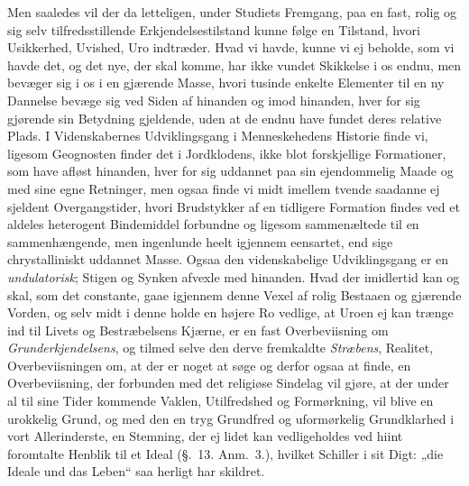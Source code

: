 \documentclass[12pt,a4paper]{book}
\newcommand{\apage}[1]{\marginnote{\footnotesize\textit{[#1]}}}
\begin{document}
Men saaledes vil der da letteligen, under Studiets Fremgang, paa en fast, rolig og
sig selv tilfredsstillende Erkjendelsestilstand kunne følge en Tilstand, hvori
Usikkerhed, Uvished, Uro indtræder. Hvad vi havde, kunne vi ej beholde, som vi
havde det, og det nye, der skal komme, har ikke vundet Skikkelse i os endnu, men
bevæger sig i os i en gjærende Masse, hvori tusinde enkelte Elementer til en ny
Dannelse bevæge sig ved Siden af hinanden og imod hinanden, hver for sig gjørende
sin Betydning gjeldende, uden at de endnu have fundet deres relative Plads. I
Videnskabernes Udviklingsgang i Menneskehedens Historie finde vi, ligesom
Geognosten finder det i Jordklodens, ikke blot forskjellige Formationer, som have
afløst hinanden, hver for sig uddannet paa sin ejendommelig Maade og med sine egne
Retninger, men ogsaa finde vi midt imellem tvende saadanne ej sjeldent
Overgangstider, hvori \apage{184}  Brudstykker af en tidligere Formation findes ved et aldeles
heterogent Bindemiddel forbundne og ligesom sammenæltede til en sammenhængende, men
ingenlunde heelt igjennem eensartet, end sige chrystalliniskt uddannet Masse.
Ogsaa den videnskabelige Udviklingsgang er en \emph{undulatorisk}; Stigen og Synken
afvexle med hinanden. Hvad der imidlertid kan og skal, som det constante, gaae
igjennem denne Vexel af rolig Bestaaen og gjærende Vorden, og selv midt i denne
holde en højere Ro vedlige, at Uroen ej kan trænge ind til Livets og
Bestræbelsens Kjærne, er en fast Overbeviisning om \emph{Grunderkjendelsens}, og tilmed
selve den derve fremkaldte \emph{Stræbens}, Realitet, Overbeviisningen om, at der er
noget at søge og derfor ogsaa at finde, en Overbeviisning, der forbunden med det
religiøse Sindelag vil gjøre, at der under al til sine Tider kommende Vaklen,
Utilfredshed og Formørkning, vil blive en urokkelig Grund, og med den en tryg
Grundfred og uformørkelig Grundklarhed i vort Allerinderste, en Stemning, der ej
lidet kan vedligeholdes ved hiint foromtalte Henblik til et Ideal (§.~13. Anm.~3.),
hvilket Schiller i sit Digt: „die Ideale und das Leben“ saa herligt har skildret.
\end{document}
